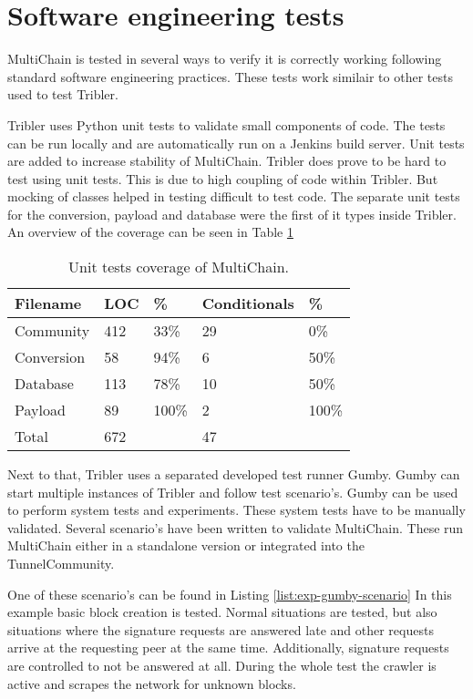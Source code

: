 \section{Software engineering tests}
MultiChain is tested in several ways to verify it is correctly working
following standard software engineering practices.
These tests work similair to other tests used to test Tribler.

Tribler uses Python unit tests  to validate small components of code.
The tests can be run locally and
are automatically run on a Jenkins build server\cite{jenkins}\cite{jenkins-tribler}.
Unit tests are added to increase stability of MultiChain.
Tribler does prove to be hard to test using unit tests.
This is due to high coupling of code within Tribler.
But mocking of classes helped in testing difficult to test code.
The separate unit tests for the conversion, payload and database were the first of it types inside Tribler.
An overview of the coverage can be seen in Table \ref{tab:tests}

\begin{table}
\centering
\begin{tabular}{l|ll|ll}
Filename   & LOC & \%    & Conditionals & \%    \\ \hline
Community  & 412 & 33\%  & 29           & 0\%   \\
Conversion & 58  & 94\%  & 6            & 50\%  \\
Database   & 113 & 78\%  & 10           & 50\%  \\
Payload    & 89  & 100\% & 2            & 100\% \\ \hline
Total      & 672 &       & 47           &
\end{tabular}
\caption{Unit tests coverage of MultiChain.}
\label{tab:tests}
\end{table}

Next to that, Tribler uses a separated developed test runner Gumby.
Gumby can start multiple instances of Tribler and follow test scenario's.
Gumby can be used to perform system tests and experiments.
These system tests have to be manually validated.
Several scenario's have been written to validate MultiChain.
These run MultiChain either in a standalone version or integrated into the TunnelCommunity.

One of these scenario's can be found in Listing \ref{list:exp-gumby-scenario}
In this example basic block creation is tested.
Normal situations are tested,
but also situations where the signature requests are answered late
and other requests arrive at the requesting peer at the same time.
Additionally, signature requests are controlled to not be answered at all.
During the whole test the crawler is active and scrapes the network for unknown blocks.

